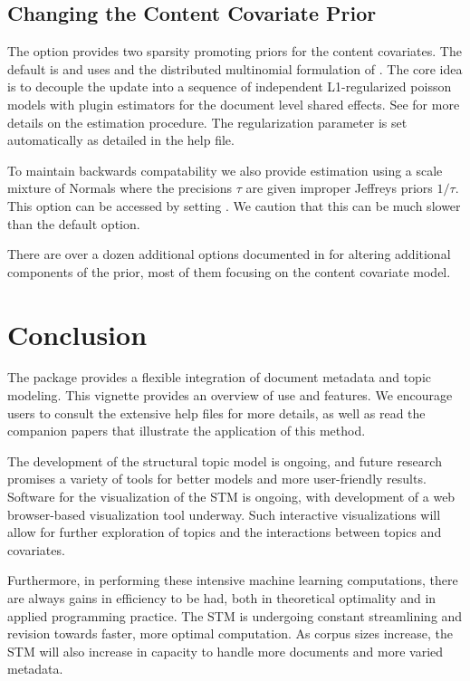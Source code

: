 \documentclass[nojss]{jss}
\begin{document}
\subsection{Changing the Content Covariate Prior}
The  option provides two sparsity promoting priors for the content covariates.  The default is  and uses  and the distributed multinomial formulation of \citet{taddy2013distributed}.  The core idea is to decouple the update into a sequence of independent L1-regularized poisson models with plugin estimators for the document level shared effects.  See \citet{STMEdo} for more details on the estimation procedure. The regularization parameter is set automatically as detailed in the  help file.

To maintain backwards compatability we also provide estimation using a scale mixture of Normals where the precisions $\tau$ are given improper Jeffreys priors $1/\tau$. This option can be accessed by setting .  We caution that this can be much slower than the default option.

There are over a dozen additional options documented in  for altering additional components of the prior, most of them focusing on the content covariate model.

\section{Conclusion}

The   package provides a flexible integration of document metadata and topic modeling. This vignette provides an overview of use and features. We encourage users to consult the extensive help files for more details, as well as read the companion papers that illustrate the application of this method.

The development of the structural topic model is ongoing, and future research promises a variety of tools for better models and more user-friendly results.  Software for the visualization of the STM is ongoing, with development of a web browser-based visualization tool underway. Such interactive visualizations will allow for further exploration of topics and the interactions between topics and covariates.

Furthermore, in performing these intensive machine learning computations, there are always gains in efficiency to be had, both in theoretical optimality and in applied programming practice.  The STM is undergoing constant streamlining and revision towards faster, more optimal computation.  As corpus sizes increase, the STM will also increase in capacity to handle more documents and more varied metadata.

\clearpage
{}

\end{document}
